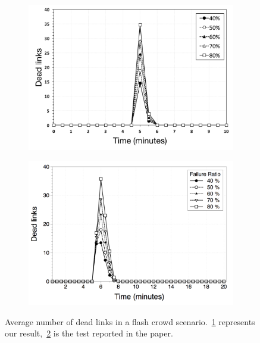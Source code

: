 \begin{figure}
\centering
\begin{subfigure}{.5\textwidth}
  \centering
  \includegraphics[keepaspectratio=true, width=1\linewidth]{images/average_dead_links}
  \caption{}
  \label{fig:average_dead_links}
\end{subfigure}%
\begin{subfigure}{.5\textwidth}
  \centering
  \includegraphics[keepaspectratio=true, width=1\linewidth]{images/paper_average_dead_links}
  \caption{}
  \label{fig:paper_average_dead_links}
\end{subfigure}
\caption{Average number of dead links in a flash crowd scenario.~\ref{fig:average_dead_links} represents our result,~\ref{fig:paper_average_dead_links} is the test reported in the paper.}
\label{fig:robustness_dead_links_failures}
\end{figure}

